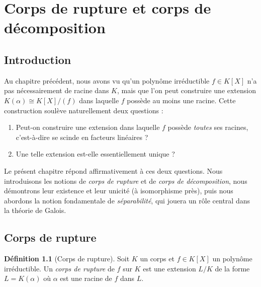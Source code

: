 \documentclass[12pt,a4paper,openany]{book}
\theoremstyle{definition}
\newtheorem{definition}{Définition}[chapter]
\begin{document}
\chapter{Corps de rupture et corps de décomposition}
\label{chap:decomposition}

\section*{Introduction}

Au chapitre précédent, nous avons vu qu'un polynôme irréductible $f \in K[X]$
n'a pas nécessairement de racine dans $K$, mais que l'on peut construire une
extension $K(\alpha) \cong K[X]/(f)$ dans laquelle $f$ possède au moins une
racine. Cette construction soulève naturellement deux questions :
\begin{enumerate}[label=(\arabic*)]
  \item Peut-on construire une extension dans laquelle $f$ possède \emph{toutes}
    ses racines, c'est-à-dire se scinde en facteurs linéaires ?
  \item Une telle extension est-elle essentiellement unique ?
\end{enumerate}
Le présent chapitre répond affirmativement à ces deux questions. Nous introduisons
les notions de \emph{corps de rupture} et de \emph{corps de décomposition}, nous
démontrons leur existence et leur unicité (à isomorphisme près), puis nous abordons
la notion fondamentale de \emph{séparabilité}, qui jouera un rôle central dans la
théorie de Galois.

\section{Corps de rupture}
\label{sec:corps-rupture}

\begin{definition}[Corps de rupture]\label{def:corps-rupture}
Soit $K$ un corps et $f \in K[X]$ un polynôme irréductible. Un \emph{corps de
rupture} de $f$ sur $K$ est une extension $L/K$ de la forme $L = K(\alpha)$ où
$\alpha$ est une racine de $f$ dans $L$.
\end{definition}
\end{document}
